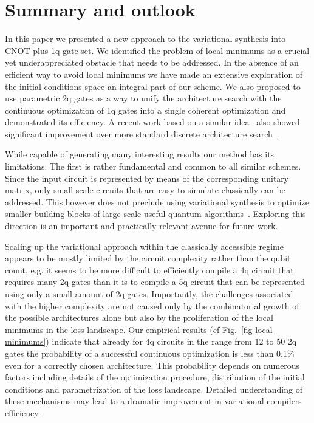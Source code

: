 \documentclass[draft, twocolumn, amsfonts, amssymb, aps, nofootinbib]{revtex4-2}
\newcommand{\CX}{\textsf{CNOT }}
\begin{document}
\section{Summary and outlook \label{sec last}}

In this paper we presented a new approach to the variational synthesis into \CX plus 1q gate set. We identified the problem of local minimums as a crucial yet underappreciated obstacle that needs to be addressed. In the absence of an efficient way to avoid local minimums we have made an extensive exploration of the initial conditions space an integral part of our scheme. We also proposed to use parametric 2q gates as a way to unify the architecture search with the continuous optimization of 1q gates into a single coherent optimization and demonstrated its efficiency. A recent work based on a similar idea~\cite{Rakyta2022} also showed significant improvement over more standard discrete architecture search~\cite{Smith2021}.

While capable of generating many interesting results our method has its limitations. The first is rather fundamental and common to all similar schemes. Since the input circuit is represented by means of the corresponding unitary matrix, only small scale circuits that are easy to simulate classically can be addressed. This however does not preclude using variational synthesis to optimize smaller building blocks of large scale useful quantum algorithms~\cite{Younis2021}. Exploring this direction is an important and practically relevant avenue for future work.

Scaling up the variational approach within the classically accessible regime appears to be mostly limited by the circuit complexity rather than the qubit count, e.g. it seems to be more difficult to efficiently compile a 4q circuit that requires many 2q gates than it is to compile a 5q circuit that can be represented using only a small amount of 2q gates. Importantly, the challenges associated with the higher complexity are not caused only by the combinatorial growth of the possible architectures alone but also by the proliferation of the local minimums in the loss landscape. Our empirical results (cf Fig.~\ref{fig local minimums}) indicate that already for 4q circuits in the range from 12 to 50 2q gates the probability of a successful continuous optimization is less than 0.1\% even for a correctly chosen architecture. This probability depends on numerous factors including details of the optimization procedure, distribution of the initial conditions and parametrization of the loss landscape. Detailed understanding of these mechanisms may lead to a dramatic improvement in variational compilers efficiency.
\end{document}
